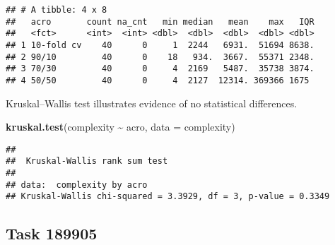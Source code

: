 \documentclass[
]{book}
\newenvironment{Shaded}{\begin{snugshade}}{\end{snugshade}}
\newcommand{\AttributeTok}[1]{\textcolor[rgb]{0.13,0.29,0.53}{#1}}
\newcommand{\FunctionTok}[1]{\textcolor[rgb]{0.13,0.29,0.53}{\textbf{#1}}}
\newcommand{\NormalTok}[1]{#1}
\newcommand{\SpecialCharTok}[1]{\textcolor[rgb]{0.81,0.36,0.00}{\textbf{#1}}}
\begin{document}
\begin{verbatim}
## # A tibble: 4 x 8
##   acro       count na_cnt   min median   mean    max   IQR
##   <fct>      <int>  <int> <dbl>  <dbl>  <dbl>  <dbl> <dbl>
## 1 10-fold cv    40      0     1  2244   6931.  51694 8638.
## 2 90/10         40      0    18   934.  3667.  55371 2348.
## 3 70/30         40      0     4  2169   5487.  35738 3874.
## 4 50/50         40      0     4  2127  12314. 369366 1675
\end{verbatim}

Kruskal--Wallis test illustrates evidence of no statistical differences.

\begin{Shaded}
\begin{Highlighting}[]
\FunctionTok{kruskal.test}\NormalTok{(complexity }\SpecialCharTok{\textasciitilde{}}\NormalTok{ acro, }\AttributeTok{data =}\NormalTok{ complexity)}
\end{Highlighting}
\end{Shaded}

\begin{verbatim}
## 
##  Kruskal-Wallis rank sum test
## 
## data:  complexity by acro
## Kruskal-Wallis chi-squared = 3.3929, df = 3, p-value = 0.3349
\end{verbatim}

\hypertarget{task-189905-1}{%
\subsection{Task 189905}\label{task-189905-1}}
\end{document}
